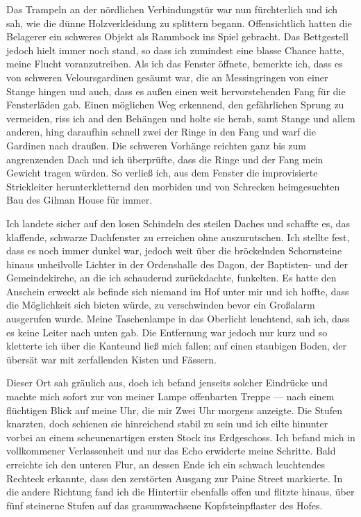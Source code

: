 Das Trampeln an der nördlichen Verbindungstür war nun fürchterlich und ich sah, wie die dünne Holzverkleidung zu splittern begann. Offensichtlich hatten die Belagerer ein schweres Objekt als Rammbock ins Spiel gebracht. Das Bettgestell jedoch hielt immer noch stand, so dass ich zumindest eine blasse Chance hatte, meine Flucht voranzutreiben. Als ich das Fenster öffnete, bemerkte ich, dass es von schweren Veloursgardinen gesäumt war, die an Messingringen von einer Stange hingen und auch, dass es außen einen weit hervorstehenden Fang für die Fensterläden gab. Einen möglichen Weg erkennend, den gefährlichen Sprung zu vermeiden, riss ich and den Behängen und holte sie herab, samt Stange und allem anderen, hing daraufhin schnell zwei der Ringe in den Fang und warf die Gardinen nach draußen. Die schweren Vorhänge reichten ganz bis zum angrenzenden Dach und ich überprüfte, dass die Ringe und der Fang mein Gewicht tragen würden. So verließ ich, aus dem Fenster die improvisierte Strickleiter herunterkletternd den morbiden und von Schrecken heimgesuchten Bau des Gilman House für immer.

Ich landete sicher auf den losen Schindeln des steilen Daches und schaffte es, das klaffende, schwarze Dachfenster zu erreichen ohne auszurutschen. Ich stellte fest, dass es noch immer dunkel war, jedoch weit über die bröckelnden Schornsteine hinaus unheilvolle Lichter in der Ordenshalle des Dagon, der Baptisten- und der Gemeindekirche, an die ich schaudernd zurückdachte, funkelten. Es hatte den Anschein erweckt als befinde sich niemand im Hof unter mir und ich hoffte, dass die Möglichkeit sich bieten würde, zu verschwinden bevor ein Großalarm ausgerufen wurde. Meine Taschenlampe in das Oberlicht leuchtend, sah ich, dass es keine Leiter nach unten gab. Die Entfernung war jedoch nur kurz und so kletterte ich über die Kanteund ließ mich fallen; auf einen staubigen Boden, der übersät war mit zerfallenden Kisten und Fässern.

Dieser Ort sah gräulich aus, doch ich befand jenseits solcher Eindrücke und machte mich sofort zur von meiner Lampe offenbarten Treppe --- nach einem flüchtigen Blick auf meine Uhr, die mir Zwei Uhr morgens anzeigte. Die Stufen knarzten, doch schienen sie hinreichend stabil zu sein und ich eilte hinunter vorbei an einem scheunenartigen ersten Stock ins Erdgeschoss. Ich befand mich in vollkommener Verlassenheit und nur das Echo erwiderte meine Schritte. Bald erreichte ich den unteren Flur, an dessen Ende ich ein schwach leuchtendes Rechteck erkannte, dass den zerstörten Ausgang zur Paine Street markierte. In die andere Richtung fand ich die Hintertür ebenfalls offen und flitzte hinaus, über fünf steinerne Stufen auf das grasumwachsene Kopfsteinpflaster des Hofes.


